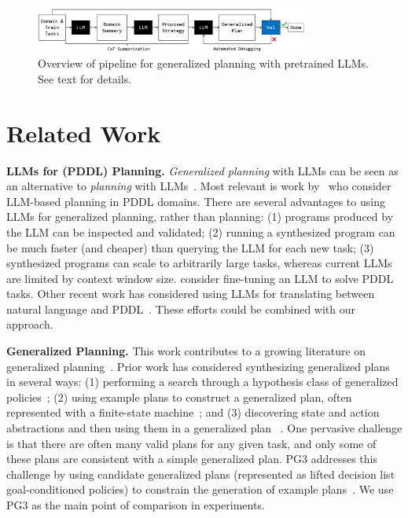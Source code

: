 \documentclass[letterpaper]{article} %
\begin{document}
\begin{figure}[t]
    \centering
    \includegraphics[width=0.8\textwidth]{teaser_figure.pdf}
    \caption{Overview of pipeline for generalized planning with pretrained LLMs. See text for details.}
    \label{fig:teaser}
\end{figure}

\section{Related Work}

\textbf{LLMs for (PDDL) Planning.}
\emph{Generalized planning} with LLMs can be seen as an alternative to \emph{planning} with LLMs~\cite{sharma2022skill,ahn2022can,huang2022language,raman2022planning,lin2022grounded}.
Most relevant is work by~\citet{valmeekam2022large,silver2022pddl} who consider LLM-based planning in PDDL domains.
There are several advantages to using LLMs for generalized planning, rather than planning: (1) programs produced by the LLM can be inspected and validated; (2) running a synthesized program can be much faster (and cheaper) than querying the LLM for each new task; (3) synthesized programs can scale to arbitrarily large tasks, whereas current LLMs are limited by context window size.
\citet{pallagani2022plansformer} consider fine-tuning an LLM to solve PDDL tasks.
Other recent work has considered using LLMs for translating between natural language and PDDL~\cite{collins2022structured,lin2023text2motion,xie2023translating,liu2023llm}.
These efforts could be combined with our approach.

\textbf{Generalized Planning.}
This work contributes to a growing literature on generalized planning~\cite{triangletables,jimenez2019review}.
Prior work has considered synthesizing generalized plans in several ways: (1) performing a search through a hypothesis class of generalized policies~\cite{levine2003learning,jimenez2015computing,segovia2018computing,segovia2021generalized}; (2) using example plans to construct a generalized plan, often represented with a finite-state machine~\cite{kplanner,Srivastava2011DirectedSF,winner2008dsplanner}; and (3) discovering state and action abstractions and then using them in a generalized plan ~\cite{genplan_representation}.
One pervasive challenge is that there are often many valid plans for any given task, and only some of these plans are consistent with a simple generalized plan.
PG3 addresses this challenge by using candidate generalized plans (represented as lifted decision list goal-conditioned policies) to constrain the generation of example plans~\cite{yang2022pg3}.
We use PG3 as the main point of comparison in experiments.
\end{document}
